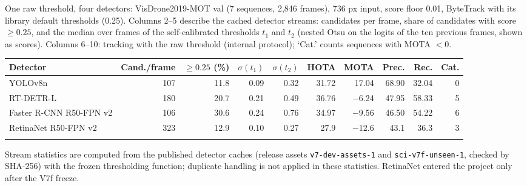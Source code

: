 \begin{tableorg}[!htbp]
\centering
\caption{One raw threshold, four detectors: VisDrone2019-MOT val (7 sequences, 2,846 frames), 736 px input, score floor 0.01, ByteTrack with its library default thresholds (0.25). Columns 2--5 describe the cached detector streams: candidates per frame, share of candidates with score $\geq 0.25$, and the median over frames of the self-calibrated thresholds $t_1$ and $t_2$ (nested Otsu on the logits of the ten previous frames, shown as scores). Columns 6--10: tracking with the raw threshold (internal protocol); `Cat.' counts sequences with MOTA $<0$.}
\label{tab:rawscale}
\footnotesize
\setlength\tabcolsep{3.5pt}
\begin{adjustbox}{max width=\linewidth}
\begin{tabular}{lrrrrrrrrr}
\toprule
Detector & Cand./frame & $\geq0.25$ (\%) & $\sigma(t_1)$ & $\sigma(t_2)$ & HOTA & MOTA & Prec. & Rec. & Cat. \\
\midrule
YOLOv8n & 107 & 11.8 & 0.09 & 0.32 & 31.72 & 17.04 & 68.90 & 32.04 & 0 \\
RT-DETR-L & 180 & 20.7 & 0.21 & 0.49 & 36.76 & \ensuremath{-}6.24 & 47.95 & 58.33 & 5 \\
Faster R-CNN R50-FPN v2 & 106 & 30.6 & 0.24 & 0.76 & 34.97 & \ensuremath{-}9.56 & 46.50 & 54.22 & 6 \\
RetinaNet R50-FPN v2 & 323 & 12.9 & 0.10 & 0.27 & 27.9 & \ensuremath{-}12.6 & 43.1 & 36.3 & 3 \\
\botrule
\end{tabular}
\end{adjustbox}
\par\smallskip\parbox{\linewidth}{\footnotesize Stream statistics are computed from the published detector caches (release assets \texttt{v7-dev-assets-1} and \texttt{sci-v7f-unseen-1}, checked by SHA-256) with the frozen thresholding function; duplicate handling is not applied in these statistics. RetinaNet entered the project only after the V7f freeze.}
\end{tableorg}

